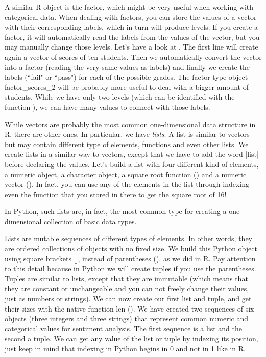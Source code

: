 A similar R object is the factor, which might be very useful when
working with categorical data. When dealing with factors, you can
store the values of a vector with their corresponding labels, which in
turn will produce levels. If you create a factor, it will
automatically read the labels from the values of the vector, but you
may manually change those levels. Let's have a look at
.  The first line will create again a vector of scores
of ten students. Then we automatically convert the vector into a
factor (reading the very same values as labels) and finally we create
the labels (``fail" or ``pass") for each of the possible grades.  The
factor-type object factor\_scores\_2 will be probably more useful to
deal with a bigger amount of students. While we have only two levels
(which can be identified with the function ), we can have many
values to connect with those labels.




While vectors are probably the most common one-dimensional data
structure in R, there are other ones. In particular, we have
\emph{lists}. A list is similar to vectors but may contain different
type of elements, functions and even other lists. We create lists in a
similar way to vectors, except that we have to add the word |list|
before declaring the values. Let's build a list with four different
kind of elements, a numeric object, a character object, a square root
function () and a numeric vector (). In fact, you
can use any of the elements in the list through indexing -- even the
function  that you stored in there to get the square root of
16!




In Python, such lists are, in fact, the most common type for creating
a one-dimensional collection of basic data types. 

Lists are mutable sequences of different types of elements. In other
words, they are ordered collections of objects with no fixed size. We
build this Python object using square brackets [], instead of
parentheses (), as we did in R. Pay attention to this detail because
in Python we will create tuples if you use the parentheses. Tuples are
similar to lists, except that they are immutable (which means that
they are constant or unchangeable and you can not freely change their
values, just as numbers or strings).  We can now create our first list
and tuple, and get their sizes with the native function len
(). We have created two sequences of six objects
(three integers and three strings) that represent common numeric and
categorical values for sentiment analysis. The first sequence is a
list and the second a tuple. We can get any value of the list or tuple
by indexing its position, just keep in mind that indexing in Python
begins in 0 and not in 1 like in R.


